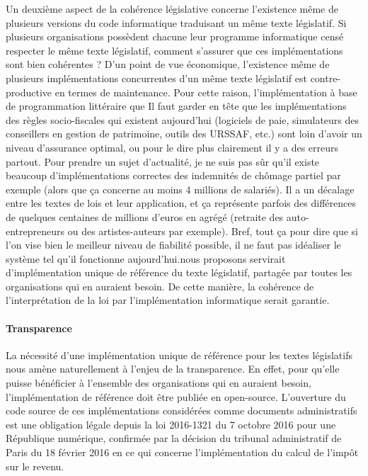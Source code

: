 Un deuxième aspect de la cohérence législative concerne l'existence même de plusieurs versions du code informatique traduisant un même texte législatif. Si plusieurs organisations possèdent chacune leur programme informatique censé respecter le même texte législatif, comment s'assurer que ces implémentations sont bien cohérentes ? D'un point de vue économique, l'existence même de plusieurs implémentations concurrentes d'un même texte législatif est contre-productive en termes de maintenance. Pour cette raison, l'implémentation à base de programmation littéraire que Il faut garder en tête que les implémentations des règles socio-fiscales qui existent aujourd'hui (logiciels de paie, simulateurs des conseillers en gestion de patrimoine, outils des URSSAF, etc.) sont loin d'avoir un niveau d'assurance optimal, ou pour le dire plus clairement il y a des erreurs partout. Pour prendre un sujet d'actualité, je ne suis pas sûr qu'il existe beaucoup d'implémentations correctes des indemnités de chômage partiel par exemple (alors que ça concerne au moins 4 millions de salariés). Il a un décalage entre les textes de lois et leur application, et ça représente parfois des différences de quelques centaines de millions d'euros en agrégé (retraite des auto-entrepreneurs ou des artistes-auteurs par exemple). Bref, tout ça pour dire que si l'on vise bien le meilleur niveau de fiabilité possible, il ne faut pas idéaliser le système tel qu'il fonctionne aujourd'hui.nous proposons servirait d'implémentation unique de référence du texte législatif, partagée par toutes les organisations qui en auraient besoin. De cette manière, la cohérence de l'interprétation de la loi par l'implémentation informatique serait garantie.

\paragraph{Transparence} La nécessité d'une implémentation unique de référence pour les textes législatifs nous amène naturellement à l'enjeu de la transparence. En effet, pour qu'elle puisse bénéficier à l'ensemble des organisations qui en auraient besoin, l'implémentation de référence doit être publiée en open-source. L'ouverture du code source de ces implémentations considérées comme documents administratifs est une obligation légale depuis la loi 2016-1321 du 7 octobre 2016 pour une République numérique, confirmée par la décision du tribunal administratif de Paris du 18 février 2016 en ce qui concerne l'implémentation du calcul de l'impôt sur le revenu.


